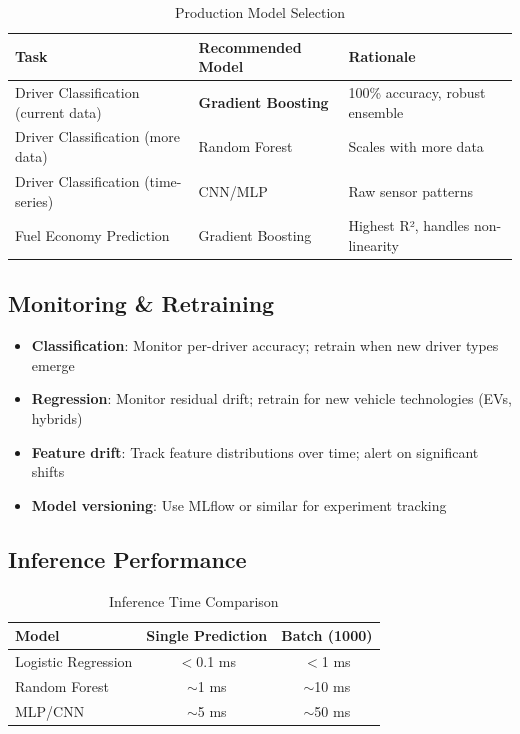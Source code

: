 \documentclass[11pt,a4paper]{article}
\begin{document}
\begin{table}[H]
\centering
\caption{Production Model Selection}
\begin{tabular}{p{4.5cm}p{4cm}p{4cm}}
\toprule
\textbf{Task} & \textbf{Recommended Model} & \textbf{Rationale} \\
\midrule
Driver Classification (current data) & \textbf{Gradient Boosting} & 100\% accuracy, robust ensemble \\
Driver Classification (more data) & Random Forest & Scales with more data \\
Driver Classification (time-series) & CNN/MLP & Raw sensor patterns \\
Fuel Economy Prediction & Gradient Boosting & Highest R², handles non-linearity \\
\bottomrule
\end{tabular}
\end{table}

\subsection{Monitoring \& Retraining}

\begin{itemize}[leftmargin=*]
    \item \textbf{Classification}: Monitor per-driver accuracy; retrain when new driver types emerge
    \item \textbf{Regression}: Monitor residual drift; retrain for new vehicle technologies (EVs, hybrids)
    \item \textbf{Feature drift}: Track feature distributions over time; alert on significant shifts
    \item \textbf{Model versioning}: Use MLflow or similar for experiment tracking
\end{itemize}

\subsection{Inference Performance}

\begin{table}[H]
\centering
\caption{Inference Time Comparison}
\begin{tabular}{lcc}
\toprule
\textbf{Model} & \textbf{Single Prediction} & \textbf{Batch (1000)} \\
\midrule
Logistic Regression & $<$0.1 ms & $<$1 ms \\
Random Forest & $\sim$1 ms & $\sim$10 ms \\
MLP/CNN & $\sim$5 ms & $\sim$50 ms \\
\bottomrule
\end{tabular}
\end{table}
\end{document}

